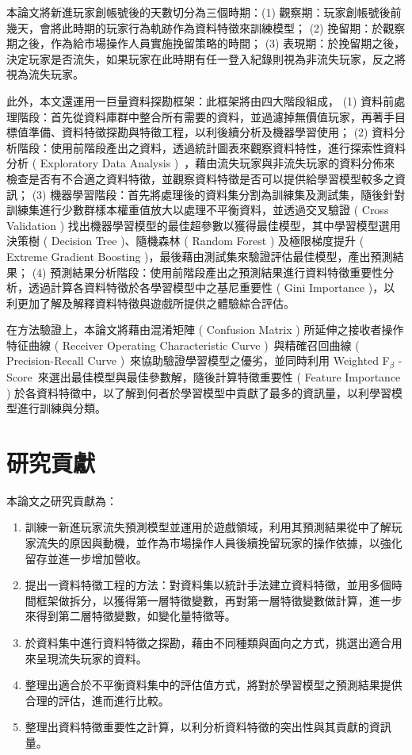 本論文將新進玩家創帳號後的天數切分為三個時期：(1) 觀察期：玩家創帳號後前幾天，會將此時期的玩家行為軌跡作為資料特徵來訓練模型； (2) 挽留期：於觀察期之後，作為給市場操作人員實施挽留策略的時間； (3) 表現期：於挽留期之後，決定玩家是否流失，如果玩家在此時期有任一登入紀錄則視為非流失玩家，反之將視為流失玩家。

此外，本文還運用一巨量資料探勘框架：此框架將由四大階段組成， (1) 資料前處理階段：首先從資料庫群中整合所有需要的資料，並過濾掉無價值玩家，再著手目標值準備、資料特徵探勘與特徵工程，以利後續分析及機器學習使用； (2) 資料分析階段：使用前階段產出之資料，透過統計圖表來觀察資料特性，進行探索性資料分析 ( Exploratory Data Analysis )~\cite{tukey1977exploratory}，藉由流失玩家與非流失玩家的資料分佈來檢查是否有不合適之資料特徵，並觀察資料特徵是否可以提供給學習模型較多之資訊； (3) 機器學習階段：首先將處理後的資料集分割為訓練集及測試集，隨後針對訓練集進行少數群樣本權重值放大以處理不平衡資料，並透過交叉驗證 ( Cross Validation ) 找出機器學習模型的最佳超參數以獲得最佳模型，其中學習模型選用決策樹 ( Decision Tree )、隨機森林 ( Random Forest ) 及極限梯度提升 ( Extreme Gradient Boosting )，最後藉由測試集來驗證評估最佳模型，產出預測結果； (4) 預測結果分析階段：使用前階段產出之預測結果進行資料特徵重要性分析，透過計算各資料特徵於各學習模型中之基尼重要性 ( Gini Importance )，以利更加了解及解釋資料特徵與遊戲所提供之體驗綜合評估。

在方法驗證上，本論文將藉由混淆矩陣 ( Confusion Matrix ) 所延伸之接收者操作特征曲線 ( Receiver Operating Characteristic Curve )~\cite{fawcett2006introduction}與精確召回曲線 ( Precision-Recall Curve )~\cite{article}來協助驗證學習模型之優劣，並同時利用 Weighted F$_{\beta}$ - Score~\cite{Goutte2005API}來選出最佳模型與最佳參數解，隨後計算特徵重要性 ( Feature Importance ) 於各資料特徵中，以了解到何者於學習模型中貢獻了最多的資訊量，以利學習模型進行訓練與分類。

\section{研究貢獻}

本論文之研究貢獻為：

\begin{enumerate}
    \item 訓練一新進玩家流失預測模型並運用於遊戲領域，利用其預測結果從中了解玩家流失的原因與動機，並作為市場操作人員後續挽留玩家的操作依據，以強化留存並進一步增加營收。
    \item 提出一資料特徵工程的方法：對資料集以統計手法建立資料特徵，並用多個時間框架做拆分，以獲得第一層特徵變數，再對第一層特徵變數做計算，進一步來得到第二層特徵變數，如變化量特徵等。
    \item 於資料集中進行資料特徵之探勘，藉由不同種類與面向之方式，挑選出適合用來呈現流失玩家的資料。
    \item 整理出適合於不平衡資料集中的評估值方式，將對於學習模型之預測結果提供合理的評估，進而進行比較。
    \item 整理出資料特徵重要性之計算，以利分析資料特徵的突出性與其貢獻的資訊量。
\end{enumerate}

